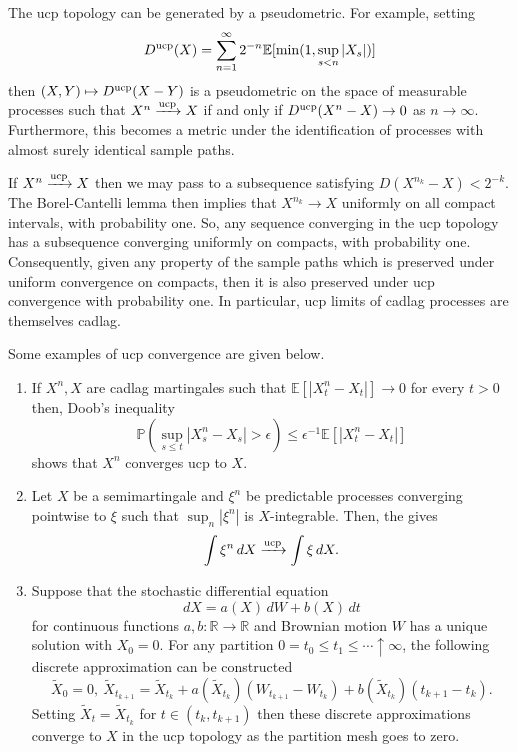 \documentclass[12pt]{article}
\begin{document}
The ucp topology can be generated by a pseudometric. For example, setting
\begin{equation*}
D^{\rm ucp}(X)=\sum_{n=1}^\infty 2^{-n}\mathbb{E}[\min(1,\sup_{s<n}|X_s|)]
\end{equation*}
then $(X,Y)\mapsto D^{\rm ucp}(X-Y)$ is a pseudometric on the space of measurable processes such that $X^n\xrightarrow{\rm ucp} X$ if and only if $D^{\rm ucp}(X^n-X)\rightarrow 0$ as $n\rightarrow\infty$.
Furthermore, this becomes a metric under the identification of processes with almost surely identical sample paths.


If $X^n\xrightarrow{\rm ucp} X$ then we may pass to a subsequence satisfying $D(X^{n_{k}}-X)<2^{-k}$. The Borel-Cantelli lemma then implies that $X^{n_k}\rightarrow X$ uniformly on all compact intervals, with probability one.
So, any sequence converging in the ucp topology has a subsequence converging uniformly on compacts, with probability one. Consequently, given any property of the sample paths which is preserved under uniform convergence on compacts, then it is also preserved under ucp convergence with probability one. In particular, ucp limits of cadlag processes are themselves cadlag.

Some examples of ucp convergence are given below.

\begin{enumerate}
\item
If $X^n,X$ are cadlag martingales such that $\mathbb{E}[|X^n_t-X_t|]\rightarrow 0$ for every $t>0$ then, Doob's inequality
\begin{equation*}
\mathbb{P}\left(\sup_{s\le t}|X^n_s-X_s|>\epsilon\right)\le\epsilon^{-1}\mathbb{E}[|X^n_t-X_t|]
\end{equation*}
shows that $X^n$ converges ucp to $X$.

\item Let $X$ be a semimartingale and $\xi^n$ be predictable processes converging pointwise to $\xi$ such that $\sup_n|\xi^n|$ is $X$-integrable. Then, the  gives
\begin{equation*}
\int\xi^n\,dX\xrightarrow{\rm ucp}\int\xi\,dX.
\end{equation*}

\item
Suppose that the stochastic differential equation
\begin{equation*}
dX=a(X)\,dW+b(X)\,dt
\end{equation*}
for continuous functions $a,b\colon\mathbb{R}\rightarrow\mathbb{R}$ and Brownian motion $W$ has a unique solution with $X_0=0$. For any partition $0=t_0\le t_1\le\cdots\uparrow\infty$, the following discrete approximation can be constructed
\begin{equation*}
\tilde X_0=0,\ \tilde X_{t_{k+1}}=\tilde X_{t_k}+a(\tilde X_{t_k})(W_{t_{k+1}}-W_{t_k})+b(\tilde X_{t_k})(t_{k+1}-t_{k}).
\end{equation*}
Setting $\tilde X_t=\tilde X_{t_k}$ for $t\in(t_k,t_{k+1})$ then these discrete approximations converge to $X$ in the ucp topology as the partition mesh goes to zero.
\end{enumerate}
\end{document}
